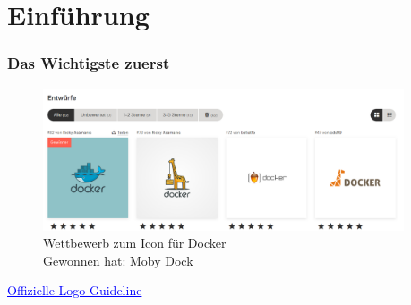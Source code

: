 \documentclass[22pt]{beamer}
\renewcommand{\href}[2]{\textcolor{blue}{\uline{#2}}}
\begin{document}
\section{Einführung}
\begin{frame}[t]
    \frametitle{Das Wichtigste zuerst}\pause
    \pause
    \begin{figure}[h]
        \centering
        \includegraphics[width=0.95\textwidth]{Bilder/wettbewerb.png}
        \caption*{Wettbewerb zum Icon für Docker\\ Gewonnen hat: Moby Dock}
    \end{figure}
    \pause
    \href{https://www.docker.com/company/newsroom/media-resources/}{Offizielle Logo Guideline}
    
    
    
\end{frame}
\end{document}
